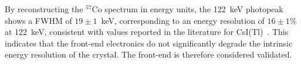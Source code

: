 By reconstructing the $^{57}$Co spectrum in energy units, the 122~keV photopeak shows a FWHM of $19 \pm 1$~keV, corresponding to an energy resolution of $16 \pm 1$\% at 122~keV, consistent with values reported in the literature for CsI(Tl)~\cite{117,118}. This indicates that the front-end electronics do not significantly degrade the intrinsic energy resolution of the crystal. The front-end is therefore considered validated.
